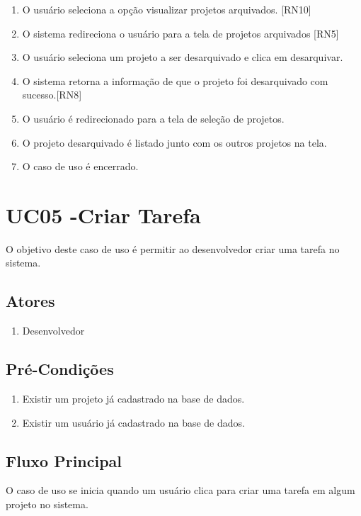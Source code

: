 \begin{enumerate}
  \item O usuário seleciona a opção visualizar projetos arquivados. [RN10]
  \item O sistema redireciona o usuário para a tela de projetos arquivados [RN5]
  \item O usuário seleciona um projeto a ser desarquivado e clica em desarquivar.
  \item O sistema retorna a informação de que o projeto foi desarquivado com sucesso.[RN8]
  \item O usuário é redirecionado para a tela de seleção de projetos.
  \item O projeto desarquivado é listado junto com os outros projetos na tela.
  \item O caso de uso é encerrado.
\end{enumerate}

\section{UC05 -Criar Tarefa}
O objetivo deste caso de uso é permitir ao desenvolvedor criar uma tarefa no sistema.

\subsection{Atores}

\begin{enumerate}
  \item Desenvolvedor
\end{enumerate}

\subsection{Pré-Condições}
\begin{enumerate}
  \item Existir um projeto já cadastrado na base de dados.
  \item Existir um usuário já cadastrado na base de dados.
\end{enumerate}

\subsection{Fluxo Principal}
O caso de uso se inicia quando um usuário clica para criar uma tarefa em algum projeto no sistema.

